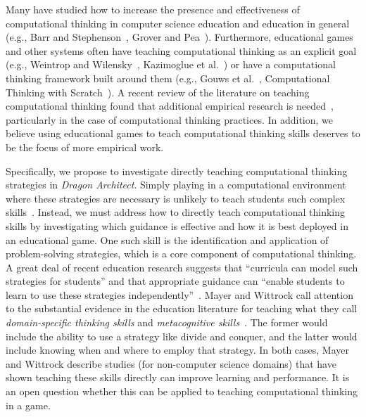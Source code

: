 \documentclass{sig-alternate}
\begin{document}
Many have studied how to increase the presence and effectiveness of computational thinking in computer science education and education in general (e.g., Barr and Stephenson~\cite{barr2011bringing}, Grover and Pea~\cite{grover2013computational}). 
Furthermore, educational games and other systems often have teaching computational thinking as an explicit goal (e.g., Weintrop and Wilensky~\cite{weintrop2013robobuilder},  Kazimoglue et al.~\cite{kazimoglu2012serious}) or have a computational thinking framework built around them (e.g., Gouws et al.~\cite{gouws2013lightbot}, Computational Thinking with Scratch~\cite{scratchedCT}).
A recent review of the literature on teaching computational thinking found that additional empirical research is needed~\cite{lye2014review}, particularly in the case of computational thinking practices.
In addition, we believe using educational games to teach computational thinking skills deserves to be the focus of more empirical work. 

Specifically, we propose to investigate directly teaching computational thinking strategies in \emph{Dragon Architect}. 
Simply playing in a computational environment where these strategies are necessary is unlikely to teach students such complex skills~\cite{mayer2004should}.
Instead, we must address how to directly teach computational thinking skills by investigating which guidance is effective and how it is best deployed in an educational game.
One such skill is the identification and application of problem-solving strategies, which is a core component of computational thinking.
A great deal of recent education research suggests that ``curricula can model such strategies for students'' and that appropriate guidance can ``enable students to learn to use these strategies independently''~\cite{report2010computational}.
Mayer and Wittrock call attention to the substantial evidence in the education literature for teaching what they call \emph{domain-specific thinking skills} and \emph{metacognitive skills}~\cite{mayer1996handbook}.
The former would include the ability to use a strategy like divide and conquer, and the latter would include knowing when and where to employ that strategy.
In both cases, Mayer and Wittrock describe studies (for non-computer science domains) that have shown teaching these skills directly can improve learning and performance. 
It is an open question whether this can be applied to teaching computational thinking in a game.
\end{document}
